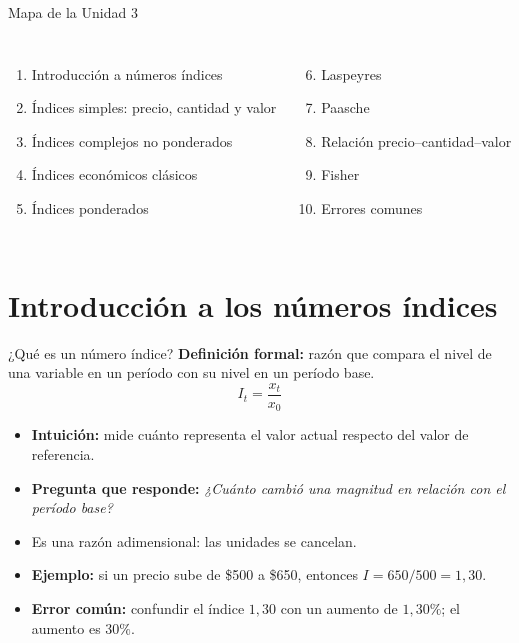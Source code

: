 \documentclass[aspectratio=169,11pt]{beamer}
\newcommand{\pregunta}[1]{\textbf{Pregunta que responde:} \emph{#1}}
\newcommand{\errorcomun}[1]{\textbf{Error común:} #1}
\newcommand{\intuicion}[1]{\textbf{Intuición:} #1}
\begin{document}
\begin{frame}{Mapa de la Unidad 3}
\small
\begin{columns}[T]
\begin{enumerate}
  \item Introducción a números índices
  \item Índices simples: precio, cantidad y valor
  \item Índices complejos no ponderados
  \item Índices económicos clásicos
  \item Índices ponderados
\end{enumerate}
\begin{enumerate}\setcounter{enumi}{5}
  \item Laspeyres
  \item Paasche
  \item Relación precio--cantidad--valor
  \item Fisher
  \item Errores comunes
\end{enumerate}
\end{columns}
\end{frame}

\section{Introducción a los números índices}

\begin{frame}{¿Qué es un número índice?}
\textbf{Definición formal:} razón que compara el nivel de una variable en un período con su nivel en un período base.
\[
I_t=\frac{x_t}{x_0}
\]
\begin{itemize}
  \item \intuicion{mide cuánto representa el valor actual respecto del valor de referencia.}
  \item \pregunta{¿Cuánto cambió una magnitud en relación con el período base?}
  \item Es una razón adimensional: las unidades se cancelan.
  \item \textbf{Ejemplo:} si un precio sube de \$500 a \$650, entonces $I=650/500=1{,}30$.
  \item \errorcomun{confundir el índice $1{,}30$ con un aumento de $1{,}30\%$; el aumento es $30\%$.}
\end{itemize}
\end{frame}
\end{document}
